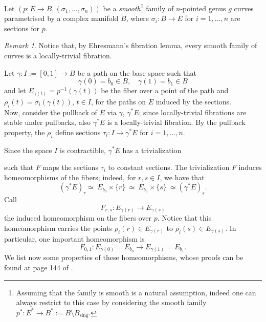 \documentclass[a4paper,12 pt,titlepage,twoside]{book}
\theoremstyle{plain}
\theoremstyle{theorem}
\theoremstyle{definition}
\theoremstyle{remark}
\newtheorem{oss}[thm]{Remark}
\begin{document}
Let $(p \colon E \rightarrow B,(\sigma_1, \dots, \sigma_n))$ be a \emph{smooth}\footnote{Assuming that the family is smooth is a natural assumption, indeed one can always restrict to this case by considering the smooth family $p^* \colon E^* \rightarrow B^* := B \setminus B_{\text{sing}}$.} family of $n$-pointed genus $g$ curves parametrised by a complex manifold $B$, where $\sigma_i \colon B \rightarrow E$ for $i = 1,\dots,n$ are sections for $p$.
\begin{oss}
	Notice that, by Ehresmann's fibration lemma, every smooth family of curves is a locally-trivial fibration.
\end{oss}
Let $\gamma \colon I:= [0,1] \rightarrow B$ be a path on the base space such that $$\gamma(0)=b_0 \in B, \quad \gamma(1)= b_1 \in B$$ and let $E_{\gamma(t)} = p^{-1}(\gamma(t))$ be the fiber over a point of the path and $\rho_i(t) = \sigma_i(\gamma(t))$, $t\in I$, for the paths on $E$ induced by the sections.\\Now, consider the pullback of $E$ via $\gamma$, $\gamma^*E$; since locally-trivial fibrations are stable under pullbacks, also $\gamma^*E$ is a locally-trivial fibration. By the pullback property, the $\rho_i$ define sections $\tau_i \colon I \rightarrow \gamma^*E$ for $i=1,\dots,n$.
\begin{center}
\end{center}
Since the space $I$ is contractible, $\gamma^*E$ has a trivialization \begin{center}
\end{center} such that $F$ maps the sections $\tau_i$ to constant sections. The trivialization $F$ induces homeomorphisms of the fibers; indeed, for $r,s \in I$, we have that $$(\gamma^*E)_r \simeq\ E_{b_0}\times\{r\}\ \simeq \ E_{b_0}\times \{s\}\  \simeq (\gamma^*E)_s.$$ Call $$F_{r,s} \colon E_{\gamma(r)} \rightarrow E_{\gamma(s)}$$ the induced homeomorphism on the fibers over $p$. Notice that this homeomorphism carries the points $\rho_i(r) \in E_{\gamma(r)}$ to $\rho_i(s) \in E_{\gamma(s)}.$ In particular, one important homeomorphism is $$F_{0,1} \colon E_{\gamma(0)} = E_{b_0} \rightarrow E_{\gamma(1)}=E_{b_1}.$$ We list now some properties of these homeomorphisms, whose proofs can be found at page 144 of \cite{MR2807457}.
\end{document}
